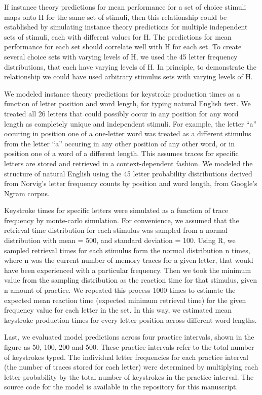 \documentclass[,man,donotrepeattitle,floatsintext]{apa6}
\begin{document}
If instance theory predictions for mean performance for a set of choice stimuli maps onto H for the same set of stimuli, then this relationship could be established by simulating instance theory predictions for multiple independent sets of stimuli, each with different values for H. The predictions for mean performance for each set should correlate well with H for each set. To create several choice sets with varying levels of H, we used the 45 letter frequency distributions, that each have varying levels of H. In principle, to demonstrate the relationship we could have used arbitrary stimulus sets with varying levels of H.

We modeled instance theory predictions for keystroke production times as a function of letter position and word length, for typing natural English text. We treated all 26 letters that could possibly occur in any position for any word length as completely unique and independent stimuli. For example, the letter \enquote{a} occuring in position one of a one-letter word was treated as a different stimulus from the letter \enquote{a} occuring in any other position of any other word, or in position one of a word of a different length. This assumes traces for specific letters are stored and retrieved in a context-dependent fashion. We modeled the structure of natural English using the 45 letter probability distributions derived from Norvig's letter frequency counts by position and word length, from Google's Ngram corpus.

Keystroke times for specific letters were simulated as a function of trace frequency by monte-carlo simulation. For convenience, we assumed that the retrieval time distribution for each stimulus was sampled from a normal distribution with mean = 500, and standard deviation = 100. Using R, we sampled retrieval times for each stimulus form the normal distribution n times, where n was the current number of memory traces for a given letter, that would have been experienced with a particular frequency. Then we took the minimum value from the sampling distribution as the reaction time for that stimulus, given n amount of practice. We repeated this process 1000 times to estimate the expected mean reaction time (expected minimum retrieval time) for the given frequency value for each letter in the set. In this way, we estimated mean keystroke production times for every letter position across different word lengths.

Last, we evaluated model predictions across four practice intervals, shown in the figure as 50, 100, 200 and 500. These practice intervals refer to the total number of keystrokes typed. The individual letter frequencies for each practice interval (the number of traces stored for each letter) were determined by multiplying each letter probability by the total number of keystrokes in the practice interval. The source code for the model is available in the repository for this manuscript.
\end{document}
